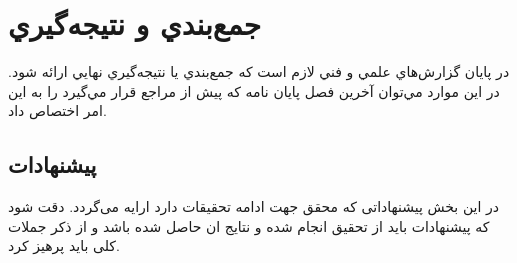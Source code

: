 \chapter{جمع‌بندي و نتيجه‌گيري}
در پايان گزارش‌هاي علمي و فني لازم است كه جمع‌بندي يا نتيجه‌گيري نهايي ارائه شود. در اين موارد مي‌توان آخرين فصل پایان نامه كه پیش از مراجع قرار مي‌گيرد را به اين امر اختصاص داد.
\section{پیشنهادات}
در این بخش پیشنهاداتی که محقق جهت ادامه تحقیقات دارد ارایه می‌گردد. دقت شود که پیشنهادات باید از  تحقیق انجام شده و نتایج ان حاصل شده باشد و از ذکر جملات کلی باید پرهیز کرد.